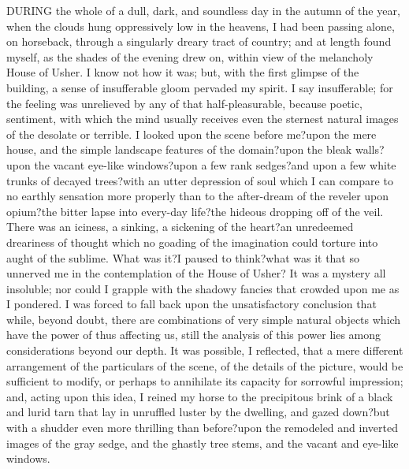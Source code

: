 \documentclass[12pt]{article}
\newcommand{\lowercaseheight}{1ex}
\newcommand{\uppercaseheight}{2ex}
\newcommand{\descenderdepth}{-1ex}
\newenvironment{drillsheet}{%
    \setlength\linenumbersep{0pt}%
    \renewcommand{\thelinenumber}{%
        \begin{tikzpicture}[overlay]
                \draw [ultra thick] ((0,0) -- ++(\textwidth,0);
                \draw ((0,\lowercaseheight) -- ++(\textwidth,0);
                \draw [thick] (0,\uppercaseheight) -- ++(\textwidth,0);
                \draw (0,\descenderdepth) -- ++(\textwidth,0);
        \end{tikzpicture}%
    }%
    \renewcommand\linenumberfont{\normalfont\color{black}}
    \begin{linenumbers}%
        \color{black!25}%
}{
    \end{linenumbers}%
}
\begin{document}
\begin{drillsheet}

  DURING the whole of a dull, dark, and soundless day in the autumn of the year, when the clouds hung oppressively low in the heavens, I had been passing alone, on horseback, through a singularly dreary tract of country; and at length found myself, as the shades of the evening drew on, within view of the melancholy House of Usher. I know not how it was; but, with the first glimpse of the building, a sense of insufferable gloom pervaded my spirit. I say insufferable; for the feeling was unrelieved by any of that half-pleasurable, because poetic, sentiment, with which the mind usually receives even the sternest natural images of the desolate or terrible. I looked upon the scene before me?upon the mere house, and the simple landscape features of the domain?upon the bleak walls?upon the vacant eye-like windows?upon a few rank sedges?and upon a few white trunks of decayed trees?with an utter depression of soul which I can compare to no earthly sensation more properly than to the after-dream of the reveler upon opium?the bitter lapse into every-day life?the hideous dropping off of the veil. There was an iciness, a sinking, a sickening of the heart?an unredeemed dreariness of thought which no goading of the imagination could torture into aught of the sublime. What was it?I paused to think?what was it that so unnerved me in the contemplation of the House of Usher? It was a mystery all insoluble; nor could I grapple with the shadowy fancies that crowded upon me as I pondered. I was forced to fall back upon the unsatisfactory conclusion that while, beyond doubt, there are combinations of very simple natural objects which have the power of thus affecting us, still the analysis of this power lies among considerations beyond our depth. It was possible, I reflected, that a mere different arrangement of the particulars of the scene, of the details of the picture, would be sufficient to modify, or perhaps to annihilate its capacity for sorrowful impression; and, acting upon this idea, I reined my horse to the precipitous brink of a black and lurid tarn that lay in unruffled luster by the dwelling, and gazed down?but with a shudder even more thrilling than before?upon the remodeled and inverted images of the gray sedge, and the ghastly tree stems, and the vacant and eye-like windows.
  

\end{drillsheet}
\end{document}
